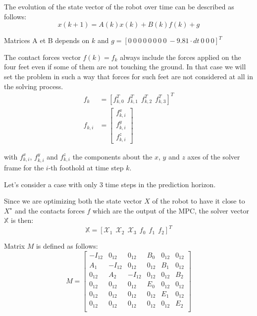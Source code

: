 \documentclass[a4paper,11pt]{article}
\begin{document}
The evolution of the state vector of the robot over time can be described as follows:
\begin{equation}
x(k+1) = A(k) x(k) + B(k) f(k) + g
\end{equation}

Matrices A et B depends on $k$ and $g = [0 ~ 0 ~ 0 ~ 0 ~ 0 ~ 0 ~ 0 ~ 0 ~ -9.81 \cdot dt~ 0 ~ 0 ~ 0]^T$

The contact forces vector $f(k) = f_k$ always include the forces applied on the four feet even if some of them are not touching the ground. In that case we will set the problem in such a way that forces for such feet are not considered at all in the solving process.
\begin{align}
f_k &= [f_{k,0}^T ~~ f_{k,1}^T ~~ f_{k,2}^T ~~ f_{k,3}^T]^T \\
f_{k,i} &= \begin{bmatrix} f^x_{k,i} \\ f^y_{k,i} \\ f^z_{k,i} \end{bmatrix}
\end{align}

with $f^x_{k,i}$, $f^y_{k,i}$ and $f^z_{k,i}$ the components about the $x$, $y$ and $z$ axes of the solver frame for the $i$-th foothold at time step $k$.

Let's consider a case with only 3 time steps in the prediction horizon.

Since we are optimizing both the state vector $X$ of the robot to have it close to $X^\star$ and the contacts forces $f$ which are the output of the MPC, the solver vector $\mathbb{X}$ is then:
\begin{equation}
\mathbb{X} = [\mathcal{X}_1 ~~ \mathcal{X}_2 ~~ \mathcal{X}_3 ~~ f_0 ~~ f_1 ~~ f_2 ]^T
\end{equation}

Matrix $M$ is defined as follows:
\begin{equation}
M = \begin{bmatrix} 
-I_{12} & 0_{12} & 0_{12}  & B_0 & 0_{12} & 0_{12}  \\
A_1 & -I_{12} & 0_{12}  & 0_{12} & B_1 & 0_{12} \\
0_{12} & A_2 & -I_{12}  & 0_{12} & 0_{12} & B_2 \\
0_{12} & 0_{12} & 0_{12}  & E_0 & 0_{12} & 0_{12} \\
0_{12} & 0_{12} & 0_{12}  & 0_{12} & E_1 & 0_{12} \\
0_{12} & 0_{12} & 0_{12}  & 0_{12} & 0_{12} & E_2 \\ \end{bmatrix}
\end{equation}
\end{document}
